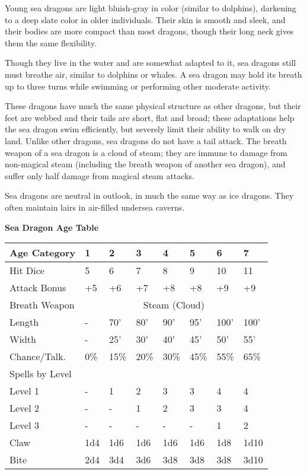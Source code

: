 \documentclass[a4paper,twoside,openany,10pt]{book}
\begin{document}
\begin{multicols}{2}
Young sea dragons are light bluish-gray in color (similar to dolphins), darkening to a deep slate color in older individuals. Their skin is smooth and sleek, and their bodies are more compact than most dragons, though their long neck gives them the same flexibility.

Though they live in the water and are somewhat adapted to it, sea dragons still must breathe air, similar to dolphins or whales. A sea dragon may hold its breath up to three turns while swimming or performing other moderate activity.

These dragons have much the same physical structure as other dragons, but their feet are webbed and their tails are short, flat and broad; these adaptations help the sea dragon swim efficiently, but severely limit their ability to walk on dry land. Unlike other dragons, sea dragons do not have a tail attack. The breath weapon of a sea dragon is a cloud of steam; they are immune to damage from non-magical steam (including the breath weapon of another sea dragon), and suffer only half damage from magical steam attacks.

Sea dragons are neutral in outlook, in much the same way as ice dragons. They often maintain lairs in air-filled undersea caverns.\\

\begin{center}
	\textbf{Sea Dragon Age Table}\medskip

\begin{tabularx}{0.47\textwidth}{@{}lXXXXXXX@{}}
Age Category & 1 & 2 & 3 & 4 & 5 & 6 & 7 \\\hline
Hit Dice & 5 & 6 & 7 & 8 & 9 & 10 & 11 \\\hline
Attack Bonus & +5 & +6 & +7 & +8 & +8 & +9 & +9 \\\hline
Breath Weapon &  \multicolumn{7}{c}{Steam (Cloud)}\\\hline
Length & - & 70' & 80' & 90' & 95' & 100' & 100' \\\hline
Width & - & 25' & 30' & 40' & 45' & 50' & 55' \\\hline
Chance/Talk. & 0\% & 15\% & 20\% & 30\% & 45\% & 55\% & 65\% \\\hline
Spells by Level & & & & & & & \\\hline
Level 1 & - & 1 & 2 & 3 & 3 & 4 & 4 \\\hline
Level 2 & - & - & 1 & 2 & 3 & 3 & 4 \\\hline
Level 3 & - & - & - & - & - & 1 & 2 \\\hline
Claw & 1d4 & 1d6 & 1d6 & 1d6 & 1d6 & 1d8 & 1d10 \\\hline
Bite & 2d4 & 3d4 & 3d6 & 3d8 & 3d8 & 3d8 & 3d10 \\\hline
\end{tabularx}
\end{center}


\end{multicols}
\end{document}
